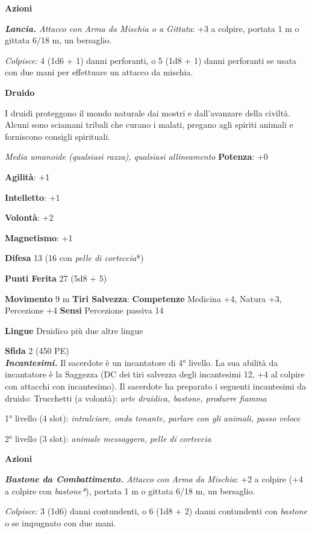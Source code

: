 \begin{multicols}{2}
\smallskip\textbf{Azioni}

\emph{\textbf{Lancia.} Attacco con Arma da Mischia o a Gittata}: +3 a
colpire, portata 1 m o gittata 6/18 m, un bersaglio.

\emph{Colpisce:} 4 (1d6 + 1) danni perforanti, o 5 (1d8 + 1) danni
perforanti se usata con due mani per effettuare un attacco da mischia.

\textbf{Druido}

I druidi proteggono il mondo naturale dai mostri e dall'avanzare della
civiltà. Alcuni sono sciamani tribali che curano i malati, pregano agli
spiriti animali e forniscono consigli spirituali.

\emph{Media umanoide (qualsiasi razza), qualsiasi allineamento}
\textbf{Potenza}: +0

\textbf{Agilità}: +1

\textbf{Intelletto}: +1

\textbf{Volontà}: +2

\textbf{Magnetismo}: +1

\textbf{Difesa} 13 (16 con \emph{pelle di corteccia}*)

\textbf{Punti Ferita} 27 (5d8 + 5)

\textbf{Movimento} 9 m
\textbf{Tiri Salvezza}:
\textbf{Competenze} Medicina +4, Natura +3, Percezione +4 \textbf{Sensi}
Percezione passiva 14

\textbf{Lingue} Druidico più due altre lingue

\textbf{Sfida} 2 (450 PE)\smallskip\\

\emph{\textbf{Incantesimi.}} Il sacerdote è un incantatore di 4°
livello. La sua abilità da incantatore è la Saggezza (DC dei tiri
salvezza degli incantesimi 12, +4 al colpire con attacchi con
incantesimo). Il sacerdote ha preparato i seguenti incantesimi da
druido: Trucchetti (a volontà): \emph{arte druidica, bastone, produrre
fiamma}

1° livello (4 slot): \emph{intralciare, onda tonante, parlare con gli}
\emph{animali, passo veloce}

2° livello (3 slot): \emph{animale messaggero, pelle di corteccia}

\smallskip\textbf{Azioni}

\emph{\textbf{Bastone da Combattimento.} Attacco con Arma da Mischia}:
+2 a colpire (+4 a colpire con \emph{bastone*}), portata 1 m o gittata
6/18 m, un bersaglio.

\emph{Colpisce:} 3 (1d6) danni contundenti, o 6 (1d8 + 2) danni
contundenti con \emph{bastone} o se impugnato con due mani.


\end{multicols}
